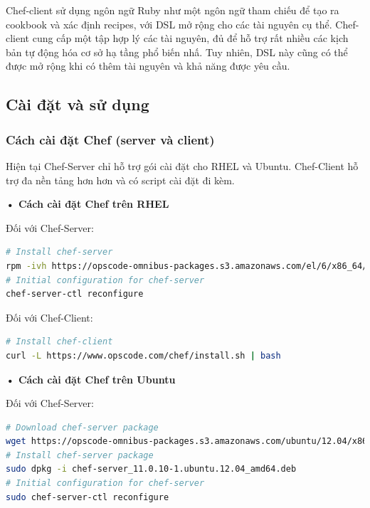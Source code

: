 Chef-client sử dụng ngôn ngữ Ruby như một ngôn ngữ tham chiếu để tạo ra cookbook và xác định recipes, với DSL mở rộng cho các tài nguyên cụ thể. Chef-client cung cấp một tập hợp lý các tài nguyên, đủ để hỗ trợ rất nhiều các kịch bản tự động hóa cơ sở hạ tầng phổ biến nhấ. Tuy nhiên, DSL này cũng có thể được mở rộng khi có thêm tài nguyên và khả năng được yêu cầu.

\newpage
\clearpage

\subsection{Cài đặt và sử dụng}

\subsubsection{Cách cài đặt Chef (server và client)}

Hiện tại Chef-Server chỉ hỗ trợ gói cài đặt cho RHEL và Ubuntu. Chef-Client hỗ trợ đa nền tảng hơn hơn và có script cài đặt đi kèm.

\textbf{• Cách cài đặt Chef trên RHEL}

Đối với Chef-Server:

\begin{lstlisting}[label={lst:chef_install_server_rhel},caption={Cách cài đặt chef-server trên RHEL},language=bash]
# Install chef-server
rpm -ivh https://opscode-omnibus-packages.s3.amazonaws.com/el/6/x86_64/chef-server-11.0.10-1.el6.x86_64.rpm
# Initial configuration for chef-server
chef-server-ctl reconfigure
\end{lstlisting}

Đối với Chef-Client:

\begin{lstlisting}[label={lst:chef_install_client_rhel},caption={Cách cài đặt chef-client trên RHEL},language=bash]
# Install chef-client
curl -L https://www.opscode.com/chef/install.sh | bash
\end{lstlisting}

\textbf{• Cách cài đặt Chef trên Ubuntu}

Đối với Chef-Server:

\begin{lstlisting}[label={lst:chef_install_server_ubuntu},caption={Cách cài đặt chef-server trên Ubuntu},language=bash]
# Download chef-server package
wget https://opscode-omnibus-packages.s3.amazonaws.com/ubuntu/12.04/x86_64/chef-server_11.0.10-1.ubuntu.12.04_amd64.deb
# Install chef-server package
sudo dpkg -i chef-server_11.0.10-1.ubuntu.12.04_amd64.deb
# Initial configuration for chef-server
sudo chef-server-ctl reconfigure
\end{lstlisting}

